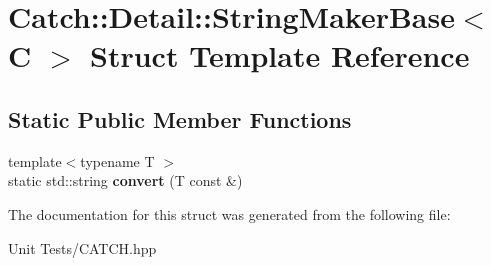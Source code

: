 \hypertarget{structCatch_1_1Detail_1_1StringMakerBase}{}\section{Catch\+:\+:Detail\+:\+:String\+Maker\+Base$<$ C $>$ Struct Template Reference}
\label{structCatch_1_1Detail_1_1StringMakerBase}
\subsection*{Static Public Member Functions}
\begin{DoxyCompactItemize}
\item 
{\footnotesize template$<$typename T $>$ }\\static std\+::string {\bfseries convert} (T const \&)\hypertarget{structCatch_1_1Detail_1_1StringMakerBase_a8eb9f635dc413a5758e22614bafaf1a3}{}\label{structCatch_1_1Detail_1_1StringMakerBase_a8eb9f635dc413a5758e22614bafaf1a3}

\end{DoxyCompactItemize}


The documentation for this struct was generated from the following file\+:\begin{DoxyCompactItemize}
\item 
Unit Tests/C\+A\+T\+C\+H.\+hpp\end{DoxyCompactItemize}

